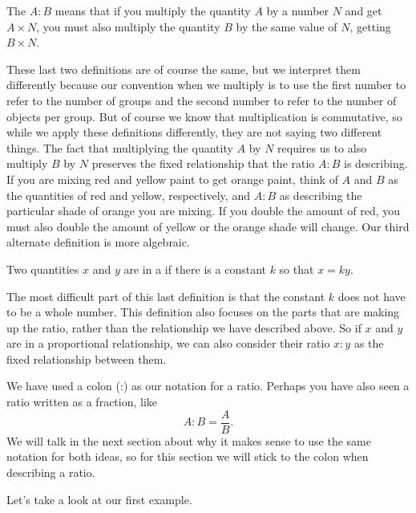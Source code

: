 \documentclass{ximera}
\begin{document}
\begin{definition}
The  $A:B$ means that if  you multiply the quantity $A$ by a number $N$ and get $A \times N$, you must also multiply the quantity $B$ by the same value of $N$, getting $B \times N$. %
\end{definition}
These last two definitions are of course the same, but we interpret them differently because our convention when we multiply is to use the first number to refer to the number of groups and the second number to refer to the number of objects per group. But of course we know that multiplication is commutative, so while we apply these definitions differently, they are not saying two different things. The fact that multiplying the quantity $A$ by $N$ requires us to also multiply $B$ by $N$ preserves the fixed relationship that the ratio $A:B$ is describing. If you are mixing red and yellow paint to get orange paint, think of $A$ and $B$ as the quantities of red and yellow, respectively, and $A:B$ as describing the particular shade of orange you are mixing. If you double the amount of red, you must also double the amount of yellow or the orange shade will change. Our third alternate definition is more algebraic.

\begin{definition}
Two quantities $x$ and $y$ are in a  if there is a constant $k$ so that $x = ky$.
\end{definition}
The most difficult part of this last definition is that the constant $k$ does not have to be a whole number. This definition also focuses on the parts that are making up the ratio, rather than the relationship we have described above. So if $x$ and $y$ are in a proportional relationship, we can also consider their ratio $x:y$ as the fixed relationship between them. 

We have used a colon (:) as our notation for a ratio. Perhaps you have also seen a ratio written as a fraction, like
\[
A:B = \frac{A}{B}.
\]
We will talk in the next section about why it makes sense to use the same notation for both ideas, so for this section we will stick to the colon when describing a ratio.

Let's take a look at our first example.
\end{document}
